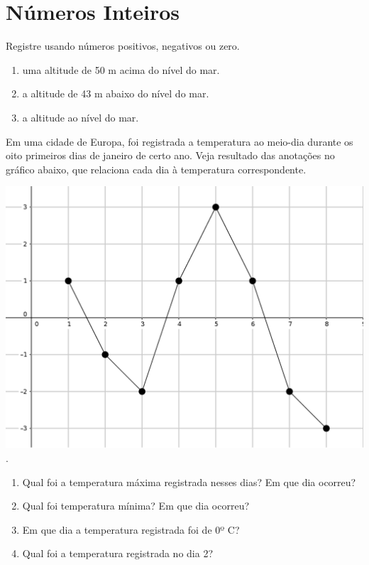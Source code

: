 \chapter{Números Inteiros}


\item Registre usando números positivos, negativos ou zero.
		\begin{enumerate}
			\item uma altitude de 50 m acima do nível do mar.
			\item a altitude de  43 m abaixo do nível do mar.
			\item a altitude ao nível do mar.
		\end{enumerate}
		
		\item Em uma cidade de Europa, foi registrada a temperatura ao meio-dia durante os oito primeiros dias de janeiro de certo ano. Veja  resultado das anotações no gráfico abaixo, que relaciona cada dia à temperatura correspondente.
		
		\begin{center}
				\includegraphics[scale=0.25]{figuras/fig42.png}.
		\end{center}		
		\begin{enumerate}
			\item Qual foi a temperatura máxima registrada nesses dias? Em que dia ocorreu?
			\item Qual foi temperatura mínima? Em que dia ocorreu?
			\item Em que dia a temperatura registrada foi de 0º C?
			\item Qual foi a temperatura registrada no dia 2?
		\end{enumerate}
		
